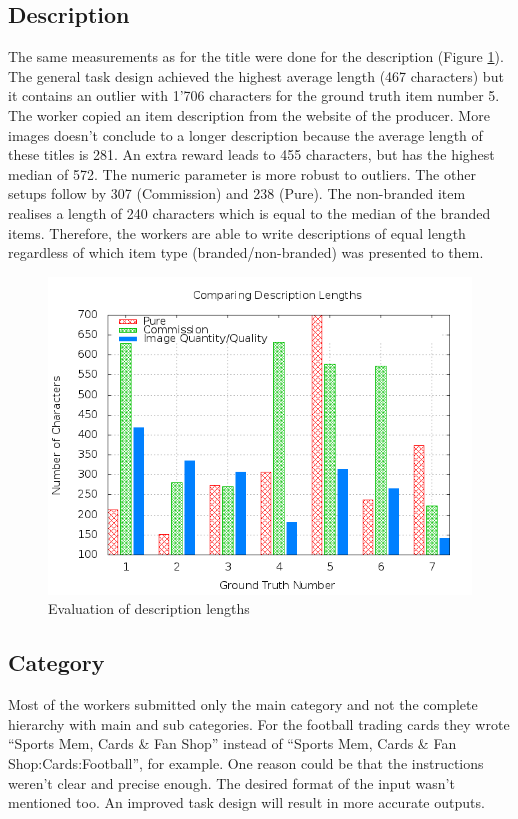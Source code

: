 \subsection{Description}
The same measurements as for the title were done for the description (Figure \ref{crowdsourcing_desc_length}). The general task design achieved the highest average length (467 characters) but it contains an outlier with 1'706 characters for the ground truth item number 5. The worker copied an item description from the website of the producer. More images doesn't conclude to a longer description because the average length of these titles is 281. An extra reward leads to 455 characters, but has the highest median of 572. The numeric parameter is more robust to outliers. The other setups follow by 307 (Commission) and 238 (Pure). The non-branded item realises a length of 240 characters which is equal to the median of the branded items. Therefore, the workers are able to write descriptions of equal length regardless of which item type (branded/non-branded) was presented to them.
\begin{figure}
\centering
\includegraphics[scale=0.55]{images/plots/crowdsourcing/plot_description_length.png}
\caption{Evaluation of description lengths}
\label{crowdsourcing_desc_length}
\end{figure}

\subsection{Category}
Most of the workers submitted only the main category and not the complete hierarchy with main and sub categories. For the football trading cards they wrote ``Sports Mem, Cards \& Fan Shop'' instead of ``Sports Mem, Cards \& Fan Shop:Cards:Football'', for example. One reason could be that the instructions weren't clear and precise enough. The desired format of the input wasn't mentioned too. An improved task design will result in more accurate outputs.
